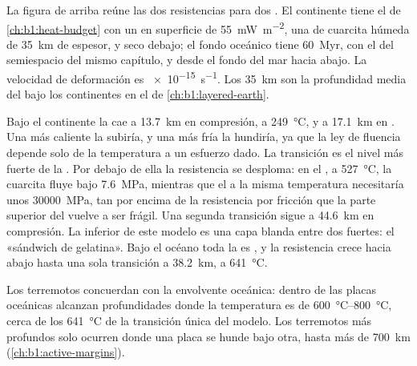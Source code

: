 La figura de arriba reúne las dos resistencias para dos . El continente tiene el  de \cref{ch:b1:heat-budget} con un 
en superficie de \qty{55}{mW.m^{-2}}, una  de cuarcita húmeda de \qty{35}{km} de espesor, y  seco debajo; el fondo oceánico tiene
\qty{60}{Myr}, con el  del semiespacio del mismo capítulo, y  desde el fondo del mar hacia abajo. La velocidad de deformación es
\qty{e-15}{s^{-1}}. Los \qty{35}{km} son la profundidad media del  bajo los continentes en el  de \cref{ch:b1:layered-earth}.

Bajo el continente la  cae a \qty{13.7}{km} en compresión, a \qty{249}{\degreeCelsius}, y a \qty{17.1}{km} en . Una
 más caliente la subiría, y una más fría la hundiría, ya que la ley de fluencia depende solo de la temperatura a un esfuerzo dado. La transición
es el nivel más fuerte de la .
Por debajo de ella la resistencia se desploma: en el , a \qty{527}{\degreeCelsius}, la cuarcita fluye bajo \qty{7.6}{MPa}, mientras que el  a la misma
temperatura necesitaría unos \qty{30000}{MPa}, tan por encima de la resistencia por fricción que la parte superior del  vuelve a ser frágil. Una segunda
transición sigue a \qty{44.6}{km} en compresión. La  inferior de este modelo es una capa blanda entre dos fuertes: el «sándwich de gelatina». Bajo el océano
toda la  es , y la resistencia crece hacia abajo hasta una sola transición a \qty{38.2}{km}, a \qty{641}{\degreeCelsius}.

Los terremotos concuerdan con la envolvente oceánica: dentro de las placas oceánicas alcanzan profundidades donde la temperatura es de \qtyrange{600}{800}{\degreeCelsius},
cerca de los \qty{641}{\degreeCelsius} de la transición única del modelo. Los terremotos más profundos solo ocurren donde una placa se hunde bajo otra, hasta más de
\qty{700}{km} (\cref{ch:b1:active-margins}).

